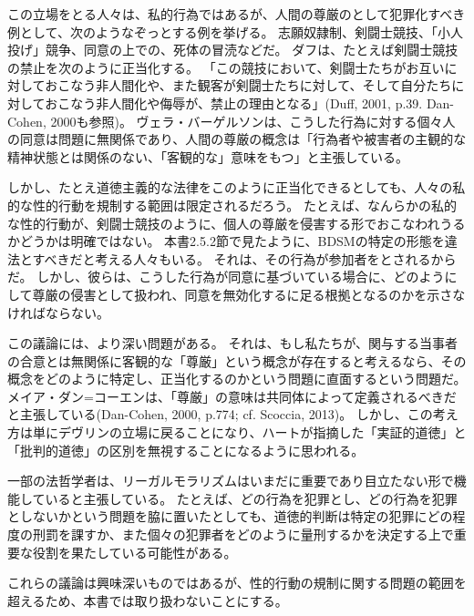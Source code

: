 \documentclass[paper=a4,book,openany]{jlreq}
\newcommand{\ig}[1]{}           %
\begin{document}
この立場をとる人々は、私的行為ではあるが、人間の尊厳のとして犯罪化すべき例として、次のようなぞっとする例を挙げる。
志願奴隷制、剣闘士競技、「小人投げ」競争、同意の上での、死体の冒涜などだ。
ダフは、たとえば剣闘士競技の禁止を次のように正当化する。
「この競技において、剣闘士たちがお互いに対しておこなう非人間化や、また観客が剣闘士たちに対して、そして自分たちに対しておこなう非人間化や侮辱が、禁止の理由となる」(Duff, 2001, p.39. Dan-Cohen, 2000も参照)。
ヴェラ・バーゲルソンは、こうした行為に対する個々人の同意は問題に無関係であり、人間の尊厳の概念は「行為者や被害者の主観的な精神状態とは関係のない、「客観的な」意味をもつ」と主張している\citep[p.217]{bergelson07:_right_be_hurt}。

しかし、たとえ道徳主義的な法律をこのように正当化できるとしても、人々の私的な性的行動を規制する範囲は限定されるだろう。
たとえば、なんらかの私的な性的行動が、剣闘士競技のように、個人の尊厳を侵害する形でおこなわれうるかどうかは明確ではない。
本書2.5.2節で見たように、BDSMの特定の形態を違法とすべきだと考える人々もいる。
それは、その行為が参加者をとされるからだ。
しかし、彼らは、こうした行為が同意に基づいている場合に、どのようにして尊厳の侵害として扱われ、同意を無効化するに足る根拠となるのかを示さなければならない。

この議論には、より深い問題がある。
それは、もし私たちが、関与する当事者の合意とは無関係に客観的な「尊厳」という概念が存在すると考えるなら、その概念をどのように特定し、正当化するのかという問題に直面するという問題だ。
メイア・ダン=コーエンは、「尊厳」の意味は共同体によって定義されるべきだと主張している(Dan-Cohen, 2000, p.774; cf. Scoccia, 2013)。
\nocite{scoccia13:_in_defen_pure_legal_moral}\nocite{dan-cohen00:_basic_values_victim_state_mind}
しかし、この考え方は単にデヴリン\ig{Patrick Devlin}の立場に戻ることになり、ハートが指摘した「実証的道徳」と「批判的道徳」の区別を無視することになるように思われる。

一部の法哲学者は、リーガルモラリズムはいまだに重要であり目立たない形で機能していると主張している。
たとえば、どの行為を犯罪とし、どの行為を犯罪としないかという問題を脇に置いたとしても、道徳的判断は特定の犯罪にどの程度の刑罰を課すか、また個々の犯罪者をどのように量刑するかを決定する上で重要な役割を果たしている可能性がある\citep[cf.][]{ristroph11:_third_wave_legal_moral}。

これらの議論は興味深いものではあるが、性的行動の規制に関する問題の範囲を超えるため、本書では取り扱わないことにする。
\end{document}
